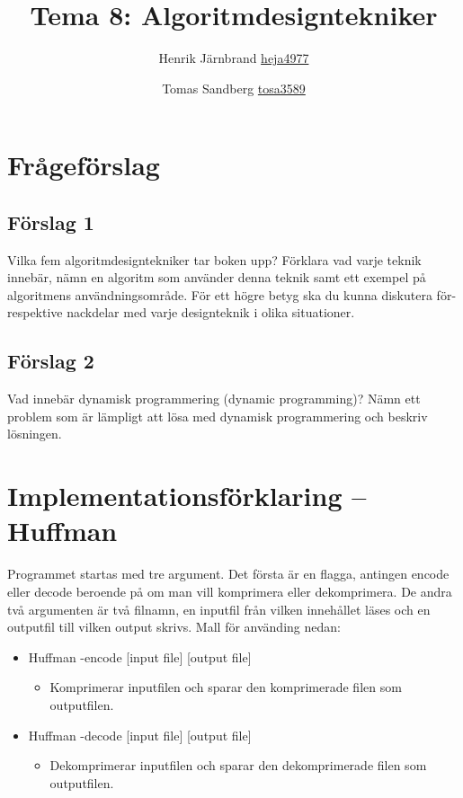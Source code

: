 \documentclass[a5paper,10pt,oneside]{article}
\title{Tema 8: Algoritmdesigntekniker}
\author{Henrik Järnbrand \url{heja4977} \and Tomas Sandberg \url{tosa3589}}
\begin{document}
\maketitle

\section{Frågeförslag}

\subsection{Förslag 1}
Vilka fem algoritmdesigntekniker tar boken upp? Förklara vad varje teknik innebär, nämn en algoritm som använder denna teknik samt ett exempel på algoritmens användningsområde. 
För ett högre betyg ska du kunna diskutera för- respektive nackdelar med varje 
designteknik i olika situationer.

\subsection{Förslag 2}
Vad innebär dynamisk programmering (dynamic programming)? Nämn ett problem som är lämpligt att lösa med dynamisk programmering och beskriv lösningen.


\section{Implementationsförklaring – Huffman}

Programmet startas med tre argument. Det första är en flagga, antingen encode eller decode beroende på om man vill komprimera eller dekomprimera. De andra två argumenten är två filnamn, en inputfil från vilken innehållet läses och en outputfil till vilken output skrivs. Mall för använding nedan:

\begin{itemize}[label={}]
	\item Huffman -encode [input file] [output file]
	\begin{itemize}[label={}]
		\item Komprimerar inputfilen och sparar den komprimerade filen som outputfilen.
	\end{itemize}
	
	\item Huffman -decode [input file] [output file]
	\begin{itemize}[label={}]
		\item Dekomprimerar inputfilen och sparar den dekomprimerade filen som outputfilen.
	\end{itemize}
	
\end{itemize}
\end{document}
